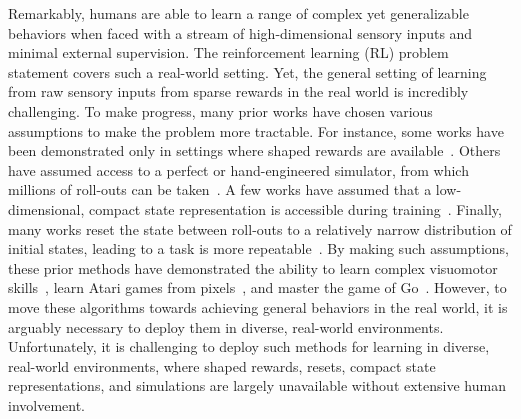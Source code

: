 

Remarkably,
humans are able to learn a range of complex yet generalizable behaviors when faced with a stream of high-dimensional sensory inputs and minimal external supervision. The reinforcement learning (RL) problem statement covers such a real-world setting. Yet, the general setting of learning from raw sensory inputs from sparse rewards in the real world is incredibly challenging. To make progress, many prior works have chosen various assumptions to make the problem more tractable. For instance, some works have been demonstrated only in settings where shaped rewards are available~\cite{todo}.
Others have assumed access to a perfect or hand-engineered simulator, from which millions of roll-outs can be taken~\cite{atari,openai_hand}.
A few works have assumed that a low-dimensional, compact state representation is accessible during training~\cite{e2e,asymmetric_ac}. Finally, many works reset the state between roll-outs to a relatively narrow distribution of initial states, leading to a task is more repeatable~\cite{atari,dsae,gps,etc}.
By making such assumptions, these prior methods have demonstrated the ability to learn complex visuomotor skills~\cite{e2e}, learn Atari games from pixels~\cite{atari}, and master the game of Go~\cite{alphago}.
However, to move these algorithms towards achieving general behaviors in the real world, it is arguably necessary to deploy them in diverse, real-world environments.
Unfortunately, it is challenging to deploy such methods for learning in diverse, real-world environments, where shaped rewards, resets, compact state representations, and simulations are largely unavailable without extensive human involvement.

